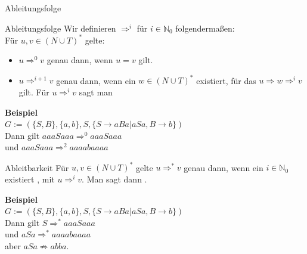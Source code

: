 \documentclass[]{beamer}
\begin{document}
\begin{frame}{Ableitungsfolge}
	\begin{block}{Ableitungsfolge}
	    Wir definieren $\Rightarrow^i$ für $i \in \mathbb{N}_0$ folgendermaßen:\\\vspace{.3cm}
		\bp Für $u,v \in (N \cup T)^*$ gelte:
		\begin{itemize}
			\item $u \Rightarrow^0 v$ genau dann, wenn $u = v$ gilt.
			\item $u \Rightarrow^{i+1} v$ genau dann, wenn ein $w \in (N \cup T)^* $ existiert, für das $u \Rightarrow w \Rightarrow^i v$ gilt.
			Für $u \Rightarrow^i v$ sagt man 
		\end{itemize}
	\end{block}

	\bp

	\textbf{Beispiel}\\
	$G:= (\{S,B\}, \{a,b\}, S, \{S \rightarrow aBa|aSa, B \rightarrow b\})$\\
	\ip Dann gilt $aaaSaaa \Rightarrow^0 aaaSaaa$ \ip \\
	und $aaaSaaa \Rightarrow^2 aaaabaaaa$
\end{frame}

\begin{frame}
	\begin{block}{Ableitbarkeit}
		Für $u,v \in (N \cup T)^*$ gelte $u \Rightarrow^* v$ genau dann, wenn ein $i \in \mathbb{N}_0$ existiert , mit $u \Rightarrow^i v$. Man sagt dann .
	\end{block}\bp
	\textbf{Beispiel}\\
	$G:= (\{S,B\}, \{a,b\}, S, \{S \rightarrow aBa|aSa, B \rightarrow b\})$\\
	\ip Dann gilt $S \Rightarrow^* aaaSaaa$ \ip \\
	und $aSa \Rightarrow^* aaaabaaaa$ \ip \\
	aber $aSa \not\Rightarrow abba$.
\end{frame}
\end{document}
